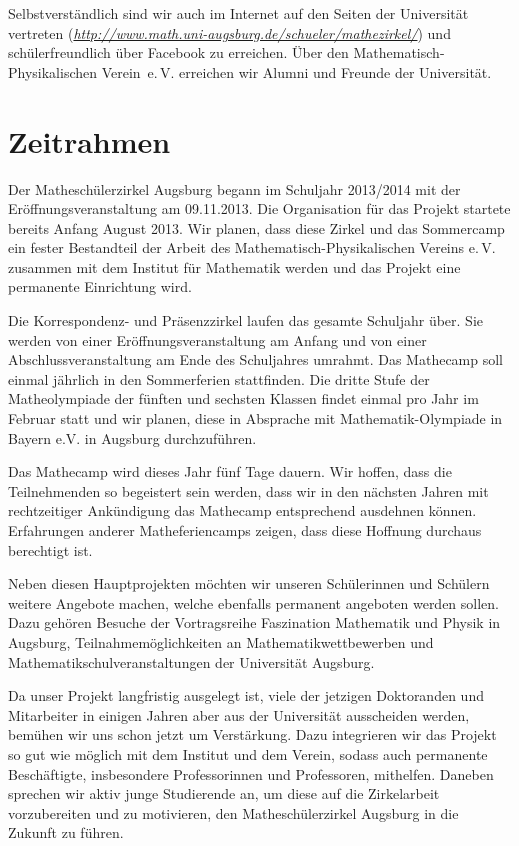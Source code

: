 \documentclass[12pt]{zettel}
\begin{document}
Selbstverständlich sind wir auch im Internet auf den Seiten der Universität
vertreten
(\href{http://www.math.uni-augsburg.de/schueler/mathezirkel/}{\textsl{http:/\!/www.math.uni-augsburg.de/schueler/mathezirkel/}})
und schülerfreundlich über Facebook zu erreichen. Über den
Mathematisch-Physikalischen Verein~e.\,V. erreichen wir Alumni und Freunde der
Universität.


\section{Zeitrahmen}

Der Matheschülerzirkel Augsburg begann im Schuljahr 2013/2014 mit der
Er\-öf\-fnungs\-ver\-an\-stal\-tung am 09.11.2013. Die Organisation für das Projekt
startete bereits Anfang August 2013. Wir planen, dass diese Zirkel und
das Sommercamp ein fester Bestandteil der Arbeit des
Mathematisch-Physikalischen Vereins e.\,V. zusammen mit dem Institut für
Mathematik werden und das Projekt eine permanente Einrichtung wird.

Die Korrespondenz- und Präsenzzirkel laufen
das gesamte Schuljahr über. Sie werden von einer
Eröffnungsveranstaltung am Anfang und von einer
Abschlussveranstaltung am Ende des Schuljahres umrahmt. Das Mathecamp soll
einmal jährlich in den Sommerferien stattfinden. Die dritte Stufe der
Matheolympiade der fünften und sechsten Klassen findet einmal pro Jahr
im Februar statt und wir planen, diese in
Absprache mit Mathematik-Olympiade in Bayern e.V. in Augsburg
durchzuführen.

Das Mathecamp wird dieses Jahr fünf Tage dauern. Wir hoffen, dass die
Teilnehmenden so begeistert sein werden,
dass wir in den nächsten Jahren mit rechtzeitiger Ankündigung das
Mathecamp entsprechend ausdehnen können. Erfahrungen anderer
Matheferiencamps zeigen, dass diese Hoffnung durchaus berechtigt ist.

Neben diesen Hauptprojekten möchten wir unseren Schülerinnen und
Schülern weitere Angebote machen, welche ebenfalls permanent angeboten
werden sollen. Dazu gehören Besuche der Vortragsreihe Faszination
Mathematik und Physik in Augsburg, Teilnahmemöglichkeiten
an Mathematikwettbewerben und Mathematikschulveranstaltungen der Universität Augsburg.

Da unser Projekt langfristig ausgelegt ist, viele der jetzigen Doktoranden und
Mitarbeiter in einigen Jahren aber aus der Universität ausscheiden werden,
bemühen wir uns schon jetzt um Verstärkung.
Dazu integrieren wir das Projekt so gut wie möglich mit
dem Institut und dem Verein, sodass auch permanente Beschäftigte,
insbesondere Professorinnen und Professoren, mithelfen. Daneben sprechen wir
aktiv junge Studierende an, um diese auf die Zirkelarbeit
vorzubereiten und zu motivieren, den Matheschülerzirkel
Augsburg in die Zukunft zu führen.
\end{document}
